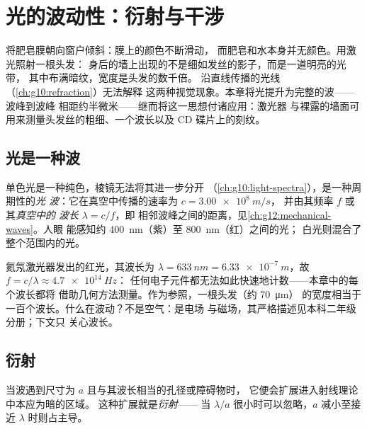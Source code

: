 \chapter{光的波动性：衍射与干涉}\label{ch:g12:light-as-wave}

将肥皂膜朝向窗户倾斜：膜上的颜色不断滑动，
而肥皂和水本身并无颜色。用激光照射一根头发：
身后的墙上出现的不是细如发丝的影子，而是一道明亮的光带，
其中布满暗纹，宽度是头发的数千倍。
沿直线传播的光线（\cref{ch:g10:refraction}）无法解释
这两种视觉现象。本章将光提升为完整的波——波峰到波峰
相距约半微米——继而将这一思想付诸应用：激光器
与裸露的墙面可用来测量头发丝的粗细、一个波长以及 CD 碟片上的刻纹。

\section{光是一种波}

\begin{definition}[光波]\label{def:g12:light-as-wave:lightwave}
单色光是一种纯色，棱镜无法将其进一步分开
（\cref{ch:g10:light-spectra}），是一种周期性的\emph{光
波}：它在真空中传播的速率为 $c = \qty{3.00e8}{m/s}$，
并由其频率 $f$ 或其\emph{真空中的
波长} $\lambda = c/f$，即
相邻波峰之间的距离，见\cref{ch:g12:mechanical-waves}。人眼
能感知约 \qty{400}{nm}（紫）至 \qty{800}{nm}（红）之间的光；
白光则混合了整个范围内的光。
\end{definition}

\begin{example}[数量级]\label{ex:g12:light-as-wave:orders}
氦氖激光器发出的红光，其波长为 $\lambda = \qty{633}{nm} =
\qty{6.33e-7}{m}$，故 $f = c/\lambda \approx \qty{4.7e14}{Hz}$：
任何电子元件都无法如此快速地计数——本章中的每个波长都将
借助几何方法测量。作为参照，一根头发（约 \qty{70}{\micro m}）
的宽度相当于一百个波长。什么在波动？不是空气：是电场
与磁场，其严格描述见本科二年级分册；下文只
关心波长。
\end{example}

\section{衍射}

\begin{definition}[衍射]\label{def:g12:light-as-wave:diffraction}
当波遇到尺寸为 $a$ 且与其波长相当的孔径或障碍物时，
它便会扩展进入射线理论中本应为暗的区域。
这种扩展就是\emph{衍射}——
当 $\lambda/a$ 很小时可以忽略，$a$ 减小至接近 $\lambda$ 时则占主导。
\end{definition}

